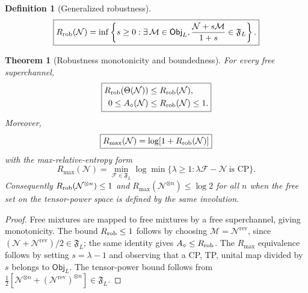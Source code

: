 \documentclass[reprint,amsmath,amssymb,aps,nofootinbib]{revtex4-2}
\newtheorem{definition}{Definition}
\newtheorem{theorem}{Theorem}
\newcommand{\F}{\mathfrak F}
\newcommand{\rev}{\mathrm{rev}}
\newcommand{\Rrob}{R_{\rm rob}}
\newcommand{\Rmax}{R_{\max}}
\begin{document}
\begin{definition}[Generalized robustness]
\begin{equation}
\boxed{
\Rrob(\mathcal N)=\inf\left\{s\ge0:\exists\,\mathcal M\in\mathsf{Obj}_L,
\frac{\mathcal N+s\mathcal M}{1+s}\in\F_L\right\}.}
\end{equation}
\end{definition}

\begin{theorem}[Robustness monotonicity and boundedness]
For every free superchannel,
\begin{equation}
\boxed{\begin{aligned}
\Rrob(\Theta(\mathcal N))&\le\Rrob(\mathcal N),\\
0\le A_\diamond(\mathcal N)&\le\Rrob(\mathcal N)\le1.
\end{aligned}}
\end{equation}
Moreover,
\begin{equation}
\boxed{\Rmax(\mathcal N)=\log[1+\Rrob(\mathcal N)]}
\end{equation}
with the max-relative-entropy form
\begin{equation}
\Rmax(\mathcal N)=
\min_{\mathcal F\in\F_L}
\log\min\{\lambda\ge1:\lambda\mathcal F-\mathcal N\ \text{is CP}\}.
\end{equation}
Consequently $\Rrob(\mathcal N^{\otimes n})\le1$ and $\Rmax(\mathcal N^{\otimes n})\le\log2$ for all $n$ when the free set on the tensor-power space is defined by the same involution.
\end{theorem}

\begin{proof}
Free mixtures are mapped to free mixtures by a free superchannel, giving monotonicity. The bound
$\Rrob\le1$ follows by choosing $\mathcal M=\mathcal N^{\rev}$, since
$(\mathcal N+\mathcal N^{\rev})/2\in\F_L$; the same identity gives $A_\diamond\le\Rrob$.
The $\Rmax$ equivalence follows by setting $s=\lambda-1$ and observing that a CP, TP, unital
map divided by $s$ belongs to $\mathsf{Obj}_L$. The tensor-power bound follows from
$\tfrac12[\mathcal N^{\otimes n}+(\mathcal N^{\rev})^{\otimes n}]\in\F_L$.
\end{proof}
\end{document}
